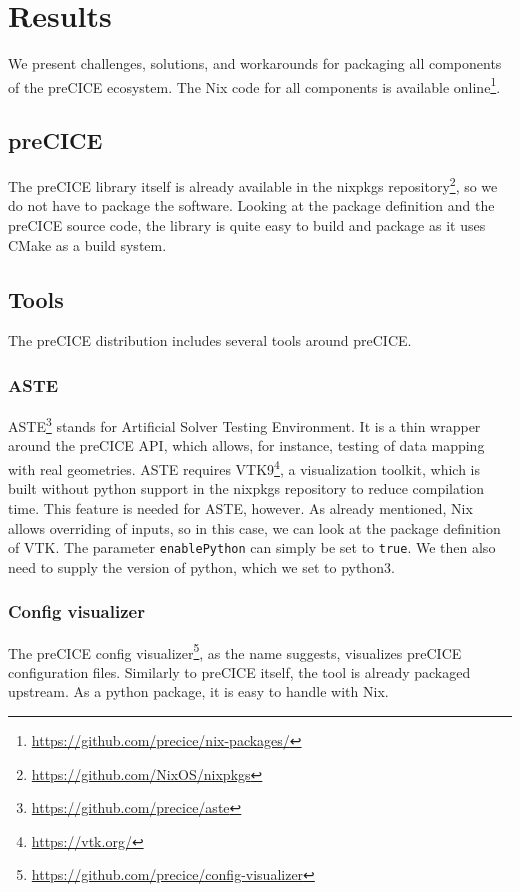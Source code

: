 \documentclass{eceasst}
\begin{document}
\section{Results}

We present challenges, solutions, and workarounds for packaging all components of the preCICE ecosystem.
The Nix code for all components is available online\footnote{\url{https://github.com/precice/nix-packages/}}.

\subsection{preCICE}

The preCICE library itself is already available in the nixpkgs repository\footnote{\url{https://github.com/NixOS/nixpkgs}}, so we do not have to package the software.
Looking at the package definition and the preCICE source code, the library is quite easy to build and package as it uses CMake as a build system.

\subsection{Tools}

The preCICE distribution includes several tools around preCICE.

\subsubsection{ASTE}

ASTE\footnote{\url{https://github.com/precice/aste}} stands for Artificial Solver Testing Environment. It is a thin wrapper around the preCICE API, which allows, for instance, testing of data mapping with real geometries.
ASTE requires VTK9\footnote{\url{https://vtk.org/}}, a visualization toolkit, which is built without python support in the nixpkgs repository to reduce compilation time.
This feature is needed for ASTE, however.
As already mentioned, Nix allows overriding of inputs, so in this case, we can look at the package definition of VTK.
The parameter \texttt{enablePython} can simply be set to \texttt{true}. We then also need to supply the version of python, which we set to python3.

\subsubsection{Config visualizer}

The preCICE config visualizer\footnote{\url{https://github.com/precice/config-visualizer}}, as the name suggests, visualizes preCICE configuration files. Similarly to preCICE itself, the tool is already packaged upstream.
As a python package, it is easy to handle with Nix.
\end{document}
